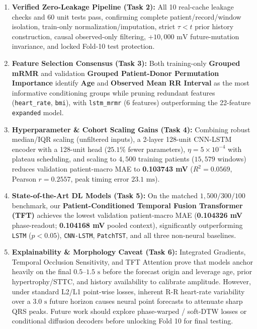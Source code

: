 \documentclass[11pt,a4paper]{article}
\begin{document}
\begin{enumerate}
    \item \textbf{Verified Zero-Leakage Pipeline (Task 2):} All 10 real-cache leakage checks and 60 unit tests pass, confirming complete patient/record/window isolation, train-only normalization/imputation, strict $\tau < t$ prior history construction, causal observed-only filtering, $+10{,}000\text{ mV}$ future-mutation invariance, and locked Fold-10 test protection.
    \item \textbf{Feature Selection Consensus (Task 3):} Both training-only \textbf{Grouped mRMR} and validation \textbf{Grouped Patient-Donor Permutation Importance} identify \textbf{Age} and \textbf{Observed Mean RR Interval} as the most informative conditioning groups while pruning redundant features (\texttt{heart\_rate}, \texttt{bmi}), with \texttt{lstm\_mrmr} (6 features) outperforming the 22-feature \texttt{expanded} model.
    \item \textbf{Hyperparameter \& Cohort Scaling Gains (Task 4):} Combining robust median/IQR scaling (unfiltered inputs), a 2-layer 128-unit CNN-LSTM encoder with a 128-unit head ($25.1\%$ fewer parameters), $\eta = 5\times 10^{-4}$ with plateau scheduling, and scaling to $4{,}500$ training patients ($15{,}579$ windows) reduces validation patient-macro MAE to \textbf{0.103743 mV} ($R^2 = 0.0569$, Pearson $r = 0.2557$, peak timing error $23.1\text{ ms}$).
    \item \textbf{State-of-the-Art DL Models (Task 5):} On the matched $1{,}500 / 300 / 100$ benchmark, our \textbf{Patient-Conditioned Temporal Fusion Transformer (TFT)} achieves the lowest validation patient-macro MAE (\textbf{0.104326 mV} phase-readout; \textbf{0.104168 mV} pooled context), significantly outperforming \texttt{LSTM} ($p < 0.05$), \texttt{CNN-LSTM}, \texttt{PatchTST}, and all three non-neural baselines.
    \item \textbf{Explainability \& Morphology Caveat (Task 6):} Integrated Gradients, Temporal Occlusion Sensitivity, and TFT Attention prove that models anchor heavily on the final $0.5\text{--}1.5\text{ s}$ before the forecast origin and leverage age, prior hypertrophy/STTC, and history availability to calibrate amplitude. However, under standard L2/L1 point-wise losses, inherent R-R heart-rate variability over a $3.0\text{ s}$ future horizon causes neural point forecasts to attenuate sharp QRS peaks. Future work should explore phase-warped / soft-DTW losses or conditional diffusion decoders before unlocking Fold 10 for final testing.
\end{enumerate}
\end{document}
